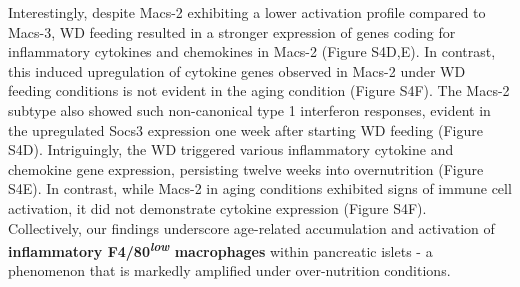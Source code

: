 Interestingly, despite Macs-2 exhibiting a lower activation profile compared to Macs-3, WD feeding resulted in a stronger expression of genes coding for inflammatory cytokines and chemokines in Macs-2 (Figure S4D,E). In contrast, this induced upregulation of cytokine genes observed in Macs-2 under WD feeding conditions is not evident in the aging condition (Figure S4F). The Macs-2 subtype also showed such non-canonical type 1 interferon responses, evident in the upregulated Socs3 expression one week after starting WD feeding (Figure S4D). Intriguingly, the WD triggered various inflammatory cytokine and chemokine gene expression, persisting twelve weeks into overnutrition (Figure S4E). In contrast, while Macs-2 in aging conditions exhibited signs of immune cell activation, it did not demonstrate cytokine expression (Figure S4F).\\

Collectively, our findings underscore age-related accumulation and activation of \textbf{inflammatory F4/80\textsuperscript{\textit{low}} macrophages} within pancreatic islets - a phenomenon that is markedly amplified under over-nutrition conditions.



